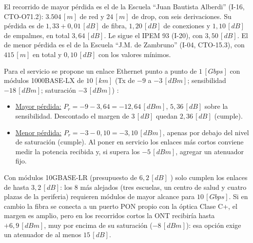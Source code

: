 El recorrido de mayor pérdida es el de la Escuela ``Juan Bautista Alberdi'' (I-16, CTO-O71.2): $3.504 \, [m]$ de red y $24 \, [m]$ de drop, con seis derivaciones. Su pérdida es de $1{,}33 + 0{,}01 \, [dB]$ de fibra, $1{,}20 \, [dB]$ de conexiones y $1{,}10 \, [dB]$ de empalmes, en total $3{,}64 \, [dB]$. Le sigue el IPEM 93 (I-20), con $3{,}50 \, [dB]$. El de menor pérdida es el de la Escuela ``J.M. de Zambruno'' (I-04, CTO-15.3), con $415 \, [m]$ en total y $0{,}10 \, [dB]$ con los valores mínimos.

Para el servicio se propone un enlace Ethernet punto a punto de $1 \, [Gbps]$ con módulos 1000BASE-LX de $10 \, [km]$ (Tx de $-9$ a $-3 \, [dBm]$; sensibilidad $-18 \, [dBm]$; saturación $-3 \, [dBm]$) \cite{sfp_1glx}:
\begin{itemize}
    \item \underline{Mayor pérdida:} $P_r = -9 - 3{,}64 = -12{,}64 \, [dBm]$, $5{,}36 \, [dB]$ sobre la sensibilidad. Descontado el margen de $3 \, [dB]$ quedan $2{,}36 \, [dB]$ (cumple).
    \item \underline{Menor pérdida:} $P_r = -3 - 0{,}10 = -3{,}10 \, [dBm]$, apenas por debajo del nivel de saturación (cumple). Al poner en servicio los enlaces más cortos conviene medir la potencia recibida y, si supera los $-5 \, [dBm]$, agregar un atenuador fijo.
\end{itemize}
Con módulos 10GBASE-LR (presupuesto de $6{,}2 \, [dB]$ \cite{fs_10glr}) solo cumplen los enlaces de hasta $3{,}2 \, [dB]$: los 8 más alejados (tres escuelas, un centro de salud y cuatro plazas de la periferia) requieren módulos de mayor alcance para $10 \, [Gbps]$. Si en cambio la fibra se conecta a un puerto PON propio con la óptica Clase C+, el margen es amplio, pero en los recorridos cortos la ONT recibiría hasta $+6{,}9 \, [dBm]$, muy por encima de su saturación ($-8 \, [dBm]$): esa opción exige un atenuador de al menos $15 \, [dB]$.

